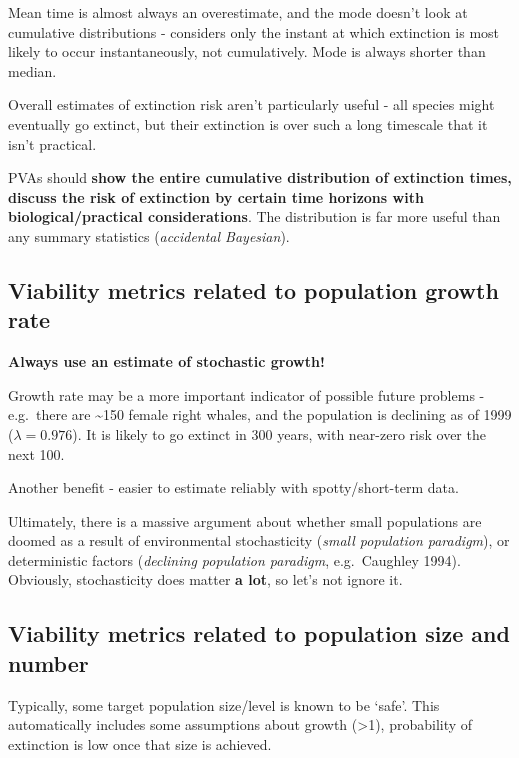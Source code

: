 \documentclass[]{article}
\begin{document}
Mean time is almost always an overestimate, and the mode doesn't look at
cumulative distributions - considers only the instant at which
extinction is most likely to occur instantaneously, not cumulatively.
Mode is always shorter than median.

Overall estimates of extinction risk aren't particularly useful - all
species might eventually go extinct, but their extinction is over such a
long timescale that it isn't practical.

PVAs should \textbf{show the entire cumulative distribution of
extinction times, discuss the risk of extinction by certain time
horizons with biological/practical considerations}. The distribution is
far more useful than any summary statistics (\emph{accidental
Bayesian}).

\subsection{Viability metrics related to population growth
rate}\label{viability-metrics-related-to-population-growth-rate}

\textbf{Always use an estimate of stochastic growth!}

Growth rate may be a more important indicator of possible future
problems - e.g.~there are \textasciitilde{}150 female right whales, and
the population is declining as of 1999 (\(\lambda = 0.976\)). It is
likely to go extinct in 300 years, with near-zero risk over the next
100.

Another benefit - easier to estimate reliably with spotty/short-term
data.

Ultimately, there is a massive argument about whether small populations
are doomed as a result of environmental stochasticity (\emph{small
population paradigm}), or deterministic factors (\emph{declining
population paradigm}, e.g.~Caughley 1994). Obviously, stochasticity does
matter \textbf{a lot}, so let's not ignore it.

\subsection{Viability metrics related to population size and
number}\label{viability-metrics-related-to-population-size-and-number}

Typically, some target population size/level is known to be `safe'. This
automatically includes some assumptions about growth (\textgreater{}1),
probability of extinction is low once that size is achieved.
\end{document}
